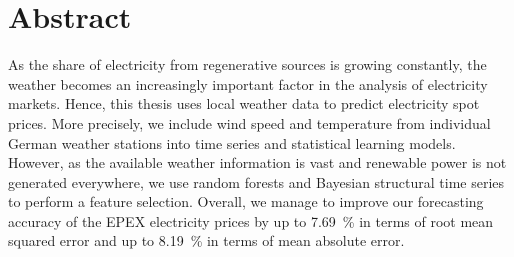 
\chapter*{Abstract}

\begin{center}
  \begin{minipage}{12cm}
    \begin{sloppypar}
		As the share of electricity from regenerative sources is growing constantly, the weather becomes an increasingly important factor in the analysis of electricity markets. Hence, this thesis uses local weather data to predict electricity spot prices. More precisely, we include wind speed and temperature from individual German weather stations into time series and statistical learning models. However, as the available weather information is vast and renewable power is not generated everywhere, we use random forests and Bayesian structural time series to perform a feature selection. Overall, we manage to improve our forecasting accuracy of the EPEX electricity prices by up to \SI{7.69}{\percent} in terms of root mean squared error and up to \SI{8.19}{\percent} in terms of mean absolute error.
    \end{sloppypar}
  \end{minipage}
\end{center}